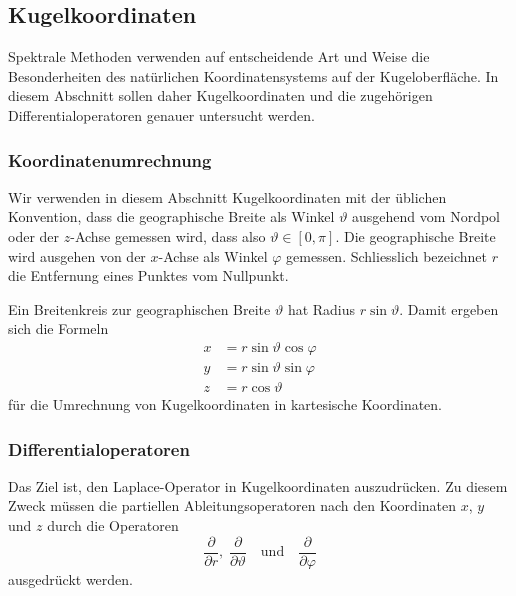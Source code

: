 %
%
%

\subsection{Kugelkoordinaten}
Spektrale Methoden verwenden auf entscheidende Art und Weise die
Besonderheiten des natürlichen Koordinatensystems auf der Kugeloberfläche.
In diesem Abschnitt sollen daher Kugelkoordinaten und die zugehörigen 
Differentialoperatoren genauer untersucht werden.

\subsubsection{Koordinatenumrechnung}
%
Wir verwenden in diesem Abschnitt Kugelkoordinaten mit der üblichen
Konvention, dass die geographische Breite als Winkel $\vartheta$
ausgehend vom Nordpol oder der $z$-Achse gemessen wird,
dass also $\vartheta\in[0,\pi]$.
Die geographische Breite wird ausgehen von der $x$-Achse als
Winkel $\varphi$ gemessen.
Schliesslich bezeichnet $r$ die Entfernung eines Punktes vom Nullpunkt.

Ein Breitenkreis zur geographischen Breite $\vartheta$ hat Radius
$r\sin\vartheta$.
Damit ergeben sich die Formeln
\begin{align*}
x
&=
r\sin\vartheta\cos\varphi
\\
y
&=
r\sin\vartheta\sin\varphi
\\
z
&=
r\cos\vartheta
\end{align*}
für die Umrechnung von Kugelkoordinaten in kartesische Koordinaten.
%

\subsubsection{Differentialoperatoren}
Das Ziel ist, den Laplace-Operator in Kugelkoordinaten auszudrücken.
Zu diesem Zweck müssen die partiellen Ableitungsoperatoren nach den
Koordinaten $x$, $y$ und $z$ durch die Operatoren
\[
\frac{\partial}{\partial r},
\;
\frac{\partial}{\partial\vartheta}
\quad\text{und}\quad
\frac{\partial}{\partial\varphi}
\]
ausgedrückt werden.

